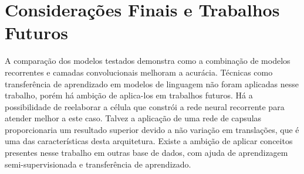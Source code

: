 \documentclass[12pt]{article}
\begin{document}
\section{Considerações Finais e Trabalhos Futuros}

A comparação dos modelos testados demonstra como a combinação de modelos recorrentes e camadas convolucionais melhoram a acurácia. Técnicas como transferência de aprendizado em modelos de linguagem não foram aplicadas nesse trabalho, porém há ambição de aplica-los em trabalhos futuros. Há a possibilidade de reelaborar a célula que constrói a rede neural recorrente para atender melhor a este caso. Talvez a aplicação de uma rede de capsulas \cite{DBLP:journals/corr/abs-1710-09829} proporcionaria um resultado superior devido a não variação em translações, que é uma das características desta arquitetura. Existe a ambição de aplicar conceitos presentes nesse trabalho em outras base de dados, com ajuda de aprendizagem semi-supervisionada e transferência de aprendizado.



\end{document}
